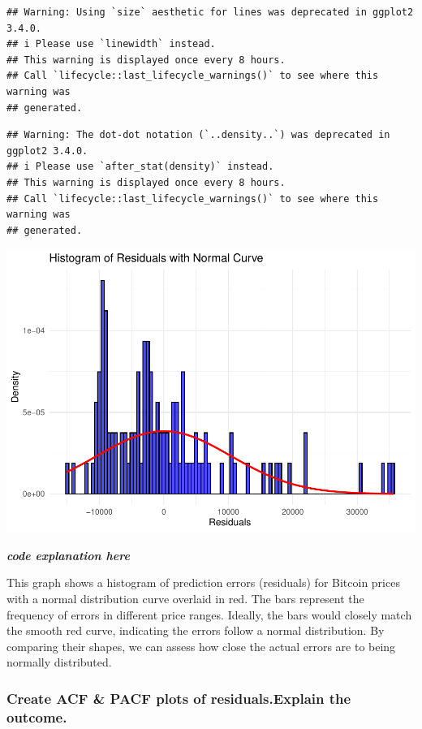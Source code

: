 \documentclass[
]{book}
\begin{document}
\begin{verbatim}
## Warning: Using `size` aesthetic for lines was deprecated in ggplot2 3.4.0.
## i Please use `linewidth` instead.
## This warning is displayed once every 8 hours.
## Call `lifecycle::last_lifecycle_warnings()` to see where this warning was
## generated.
\end{verbatim}

\begin{verbatim}
## Warning: The dot-dot notation (`..density..`) was deprecated in ggplot2 3.4.0.
## i Please use `after_stat(density)` instead.
## This warning is displayed once every 8 hours.
## Call `lifecycle::last_lifecycle_warnings()` to see where this warning was
## generated.
\end{verbatim}

\includegraphics{bookdown-demo_files/figure-latex/unnamed-chunk-25-1.pdf}

\emph{\textbf{code explanation here}}

This graph shows a histogram of prediction errors (residuals) for Bitcoin prices with a normal distribution curve overlaid in red. The bars represent the frequency of errors in different price ranges. Ideally, the bars would closely match the smooth red curve, indicating the errors follow a normal distribution. By comparing their shapes, we can assess how close the actual errors are to being normally distributed.

\subsubsection{Create ACF \& PACF plots of residuals.Explain the outcome.}\label{create-acf-pacf-plots-of-residuals.explain-the-outcome.}
\end{document}
